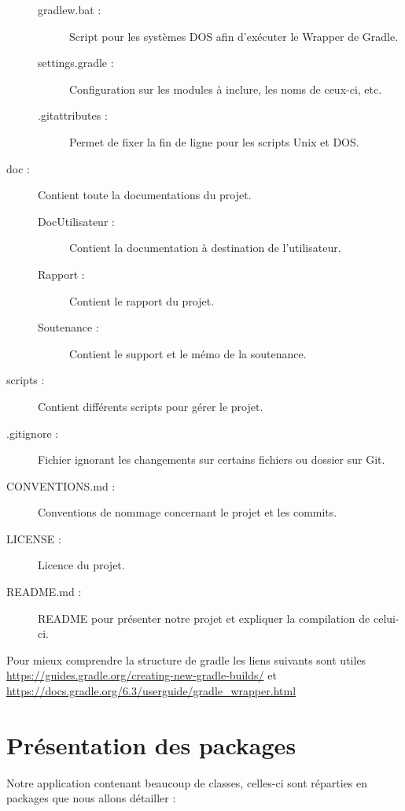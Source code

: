 \begin{description}
\begin{description}
				\item[gradlew.bat :]{Script pour les systèmes DOS afin d'exécuter le Wrapper de Gradle.}
				\item[settings.gradle :]{Configuration sur les modules à inclure, les noms de ceux-ci, etc.}
				\item[.gitattributes :]{Permet de fixer la fin de ligne pour les scripts Unix et DOS.}
			\end{description}
			\item[doc :]{Contient toute la documentations du projet.}
			\begin{description}
				\item[DocUtilisateur :]{Contient la documentation à destination de l'utilisateur.}
				\item[Rapport :]{Contient le rapport du projet.}
				\item[Soutenance :]{Contient le support et le mémo de la soutenance.}
			\end{description}
			\item[scripts :]{Contient différents scripts pour gérer le projet.}
			\item[.gitignore :]{Fichier ignorant les changements sur certains fichiers ou dossier sur Git.}
			\item[CONVENTIONS.md :]{Conventions de nommage concernant le projet et les commits.}
			\item[LICENSE :]{Licence du projet.}
			\item[README.md :]{README pour présenter notre projet et expliquer la compilation de celui-ci.}
		\end{description}

		Pour mieux comprendre la structure de gradle les liens suivants sont utiles \url{https://guides.gradle.org/creating-new-gradle-builds/} et \url{https://docs.gradle.org/6.3/userguide/gradle_wrapper.html}

	\section{Présentation des packages}

		Notre application contenant beaucoup de classes, celles-ci sont réparties en packages que nous allons détailler :

